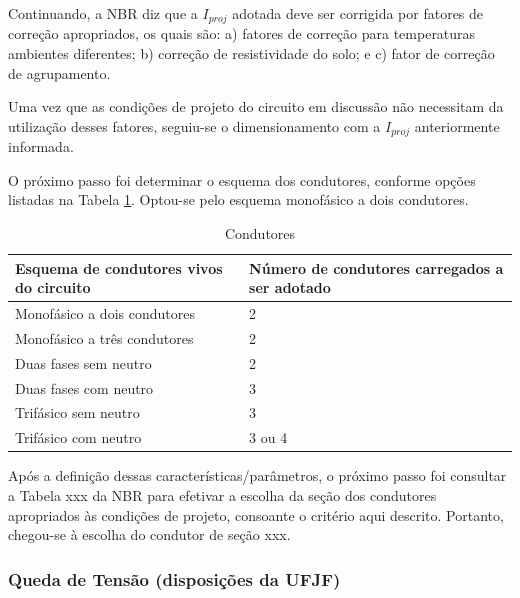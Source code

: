 Continuando, a NBR diz que a $I_{proj}$ adotada deve ser corrigida por fatores de correção apropriados, os quais são: a) fatores de correção para temperaturas ambientes diferentes; b) correção de resistividade do solo; e c) fator de correção de agrupamento.

Uma vez que as condições de projeto do circuito em discussão não necessitam da utilização desses fatores, seguiu-se o dimensionamento com a $I_{proj}$ anteriormente informada.

	O próximo passo foi determinar o esquema dos condutores, conforme opções listadas na Tabela \ref{metodo-definicao}. Optou-se pelo esquema monofásico a dois condutores.
	
\begin{table}[h]
\centering
\begin{tabular}{| l | p{7cm} |}
\hline
Esquema de condutores vivos do circuito & Número de condutores carregados a ser adotado \\ \hline
Monofásico a dois condutores            & 2                                             \\ \hline
Monofásico a três condutores            & 2                                             \\ \hline
Duas fases sem neutro                   & 2                                             \\ \hline
Duas fases com neutro                   & 3                                             \\ \hline
Trifásico sem neutro                    & 3                                             \\ \hline
Trifásico com neutro                    & 3 ou 4
\\ \hline
\end{tabular}
\caption{Condutores}
\label{metodo-definicao}
\end{table}

Após a definição dessas características/parâmetros, o próximo passo foi consultar a Tabela xxx da NBR para efetivar a escolha da seção dos condutores apropriados às condições de projeto, consoante o critério aqui descrito. Portanto, chegou-se à escolha do condutor de seção xxx.

\subsubsection{Queda de Tensão (disposições da UFJF)}

